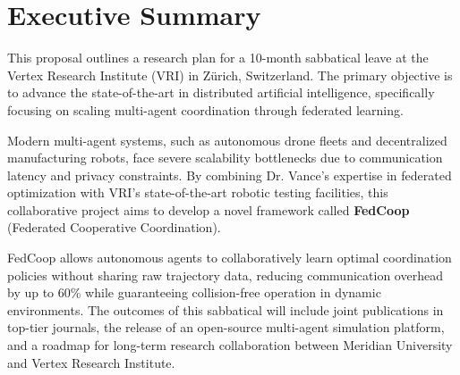 \section{Executive Summary}
This proposal outlines a research plan for a 10-month sabbatical leave at the Vertex Research Institute (VRI) in Zürich, Switzerland. The primary objective is to advance the state-of-the-art in distributed artificial intelligence, specifically focusing on scaling multi-agent coordination through federated learning.

Modern multi-agent systems, such as autonomous drone fleets and decentralized manufacturing robots, face severe scalability bottlenecks due to communication latency and privacy constraints. By combining Dr. Vance's expertise in federated optimization with VRI's state-of-the-art robotic testing facilities, this collaborative project aims to develop a novel framework called \textbf{FedCoop} (Federated Cooperative Coordination). 

FedCoop allows autonomous agents to collaboratively learn optimal coordination policies without sharing raw trajectory data, reducing communication overhead by up to 60\% while guaranteeing collision-free operation in dynamic environments. The outcomes of this sabbatical will include joint publications in top-tier journals, the release of an open-source multi-agent simulation platform, and a roadmap for long-term research collaboration between Meridian University and Vertex Research Institute.
